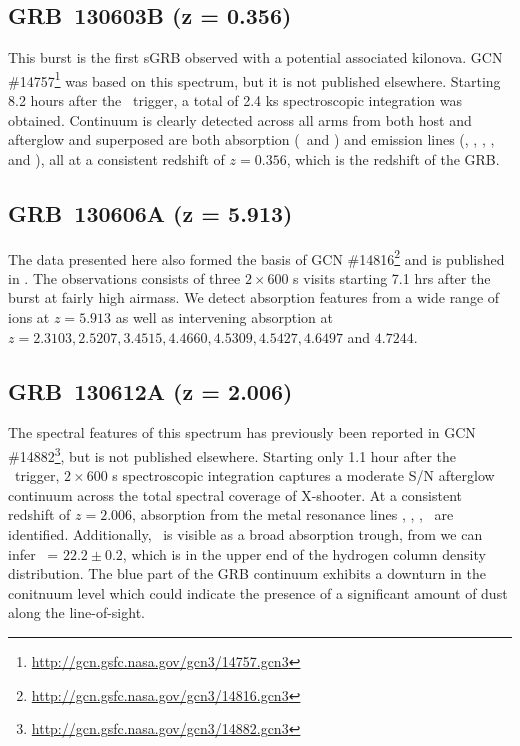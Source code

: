 \documentclass{aa}    %
\begin{document}
\subsection{GRB~130603B (z = 0.356)}

This burst is the first sGRB observed with a potential associated
kilonova\citep{Tanvir2013a, Berger2013a}.  GCN
\#14757\footnote{\url{http://gcn.gsfc.nasa.gov/gcn3/14757.gcn3}} was based on
this spectrum, but it is not published elsewhere. Starting 8.2 hours after the
\swift~trigger, a total of 2.4 ks spectroscopic integration was obtained.
Continuum is clearly detected across all arms from both host and afterglow and
superposed are both absorption (\cahk~and \mgii) and emission lines (\oii, \hb,
\oiii, \ha, and \sii), all at a consistent redshift of $z = 0.356$, which is the
redshift of the GRB.

\subsection{GRB~130606A (z = 5.913)}

The data presented here also formed the basis of GCN
\#14816\footnote{\url{http://gcn.gsfc.nasa.gov/gcn3/14816.gcn3}} and is
published in \citet{Hartoog2015}. The observations consists of three
$2\times600$ s visits starting 7.1 hrs after the burst at fairly high airmass.
We detect absorption features from a wide range of ions at $z=5.913$ as well as
intervening absorption at $z=2.3103, 2.5207, 3.4515, 4.4660, 4.5309, 4.5427,
4.6497 $ and $ 4.7244$.


\subsection{GRB~130612A (z = 2.006)}

The spectral features of this spectrum has previously been reported in GCN
\#14882\footnote{\url{http://gcn.gsfc.nasa.gov/gcn3/14882.gcn3}}, but is not
published elsewhere. Starting only 1.1 hour after the \swift~trigger,
$2\times600$ s spectroscopic integration captures a moderate S/N afterglow
continuum across the total spectral coverage of X-shooter. At a consistent
redshift of $z = 2.006$, absorption from the metal resonance lines \feii, \mnii,
\mgii, \mgi~are identified. Additionally, \lya~is visible as a broad absorption
trough, from we can infer \nh~= $22.2 \pm 0.2$, which is in the upper end of the
hydrogen column density distribution. The blue part of the GRB continuum
exhibits a downturn in the conitnuum level which could indicate the presence of
a significant amount of dust along the line-of-sight.
\end{document}
